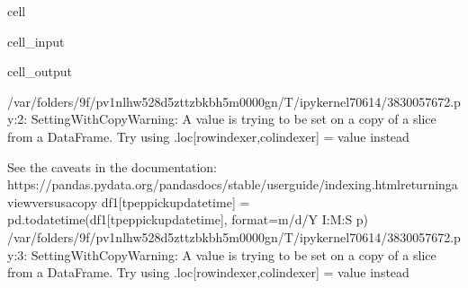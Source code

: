\documentclass[letterpaper,10pt,english]{sphinxmanual}
\begin{document}
\begin{sphinxuseclass}{cell}
\begin{sphinxuseclass}{cell_input}
\begin{sphinxVerbatim}[commandchars=\\\{\}]
\PYG{p}{[}\PYG{p}{]}  \PYG{p}{[}\PYG{p}{]} 
\PYG{p}{[}\PYG{p}{]}  \PYG{p}{[}\PYG{p}{]} 
\end{sphinxVerbatim}

\end{sphinxuseclass}
\begin{sphinxuseclass}{cell_output}
\begin{sphinxVerbatim}[commandchars=\\\{\}]
/var/folders/9f/pv1nlhw528d\PYGZus{}5zttzbkb\PYGZus{}h5m0000gn/T/ipykernel\PYGZus{}70614/3830057672.py:2: SettingWithCopyWarning: 
A value is trying to be set on a copy of a slice from a DataFrame.
Try using .loc[row\PYGZus{}indexer,col\PYGZus{}indexer] = value instead

See the caveats in the documentation: https://pandas.pydata.org/pandas\PYGZhy{}docs/stable/user\PYGZus{}guide/indexing.html\PYGZsh{}returning\PYGZhy{}a\PYGZhy{}view\PYGZhy{}versus\PYGZhy{}a\PYGZhy{}copy
  df1[\PYGZsq{}tpep\PYGZus{}pickup\PYGZus{}datetime\PYGZsq{}] = pd.to\PYGZus{}datetime(df1[\PYGZsq{}tpep\PYGZus{}pickup\PYGZus{}datetime\PYGZsq{}], format=\PYGZsq{}\PYGZpc{}m/\PYGZpc{}d/\PYGZpc{}Y \PYGZpc{}I:\PYGZpc{}M:\PYGZpc{}S \PYGZpc{}p\PYGZsq{})
/var/folders/9f/pv1nlhw528d\PYGZus{}5zttzbkb\PYGZus{}h5m0000gn/T/ipykernel\PYGZus{}70614/3830057672.py:3: SettingWithCopyWarning: 
A value is trying to be set on a copy of a slice from a DataFrame.
Try using .loc[row\PYGZus{}indexer,col\PYGZus{}indexer] = value instead


\end{sphinxVerbatim}
\end{sphinxuseclass}
\end{sphinxuseclass}
\end{document}
